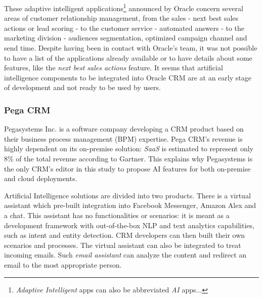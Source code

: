 These adaptive intelligent applications\footnote{\textit{Adaptive Intelligent} apps can also be abbreviated \textit{AI} apps...} announced by Oracle concern several areas of customer relationship management, from the sales - next best sales actions or lead scoring - to the customer service - automated answers - to the marketing division -  audiences segmentation, optimized campaign channel and send time. Despite having been in contact with Oracle's team, it was not possible to have a list of the applications already available or to have details about some features, like the \textit{next best sales actions} feature. It seems that artificial intelligence components to be integrated into Oracle CRM are at an early stage of development and not ready to be used by users. 


\subsubsection*{Pega CRM}
Pegasystems Inc. is a software company developing a CRM product based on their business process management (BPM) expertise. Pega CRM's revenue is highly dependent on its on-premise solution: \textit{SaaS} is estimated to represent only 8\% of the total revenue according to Gartner. This explains why Pegasystems is the only CRM's editor in this study to propose AI features for both on-premise and cloud deployments.

Artificial Intelligence solutions are divided into two products. There is a virtual assistant which pre-built integration into Facebook Messenger, Amazon Alex and a chat. This assistant has no functionalities or scenarios: it is meant as a development framework with out-of-the-box NLP and text analytics capabilities, such as intent and entity detection. CRM developers can then built their own scenarios and processes. The virtual assistant can also be integrated to treat incoming emails. Such \textit{email assistant} can analyze the content and redirect an email to the most appropriate person.

